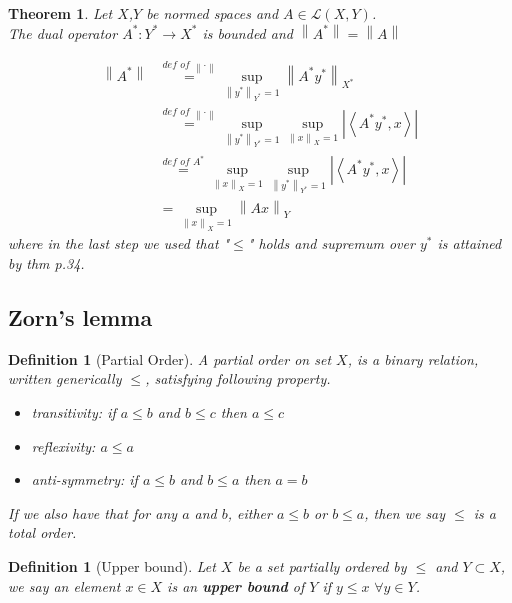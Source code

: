 \documentclass{article}
\newcommand{\nextline}{\hfill\break}
\newcommand{\inne}[2]{\left<{#1},{#2}\right>}
\newcommand{\norm}[1]{\left\|{#1}\right\|}
\newcommand{\dual}[1]{{#1}^*}
\newcommand{\func}[3]{\({#1}:{#2}\xrightarrow{}{#3}\)}
\newtheorem{definition}[example]{Definition}
\newtheorem{theorem}[example]{Theorem}
\begin{document}
\begin{theorem}\rm\nextline
    Let \(X\),\(Y\) be normed spaces and \(A\in\mathcal{L}(X,Y)\).\\ The dual operator \func{\dual A}{\dual Y}{\dual X} is bounded and \(\norm{\dual A}=\norm{A}\)
    \begin{pf}{}{}
        \begin{equation}
            \begin{split}
                \norm{\dual A}&\stackrel{\textit{def of } \norm{\cdot}}{=}\sup_{\norm{\dual y}_{\dual Y}=1}\norm{\dual A\dual y}_{\dual X}\\
                &\stackrel{\textit{def of }\norm{\cdot}}{=}\sup_{\norm{\dual y}_{\dual Y}=1}\sup_{\norm{x}_X=1}|\inne{\dual A\dual y}{x}|\\
                &\stackrel{\textit{def of }\dual A}{=}\sup_{\norm{x}_X=1}\sup_{\norm{\dual y}_{\dual Y}=1}|\inne{\dual A\dual y}{x}|\\
                &=\sup_{\norm{x}_X=1}\norm{Ax}_Y
            \end{split}
        \end{equation}
        where in the last step we used  that "\(\leq\)" holds and supremum over \(\dual y\) is attained by thm p.34.
    \end{pf}
\end{theorem}

\subsection{Zorn's lemma}
\begin{definition}[Partial Order]\rm \nextline
    A partial order on set \(X\), is a binary relation, written generically \(\leq\), satisfying following property.
    \begin{itemize}
        \item transitivity: if \(a\leq b\) and \(b\leq c\) then \(a\leq c\)
        \item reflexivity: \(a\leq a\)
        \item anti-symmetry: if \(a\leq b\) and \(b\leq a\) then \(a=b\)

    \end{itemize}
    If we also have that for any \(a\) and \(b\), either \(a\leq b\) or \(b\leq a\), then we say \(\leq\) is a total order.

\end{definition}

\begin{definition}[Upper bound]\rm\nextline
    Let \(X\) be a set partially ordered by \(\leq\) and \(Y\subset X\), we say an element \(x\in X\) is an {\bf upper bound} of \(Y\) if \(y\leq x\,\,\forall y\in Y\).

\end{definition}
\end{document}
